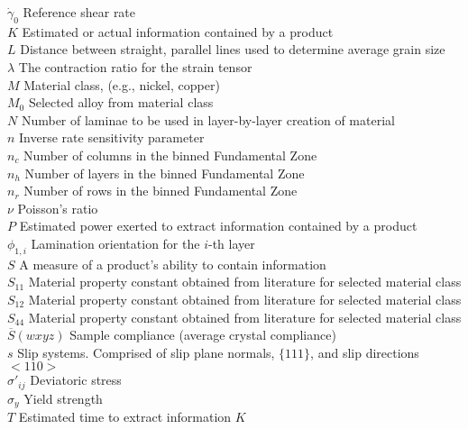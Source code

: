 \begin{tabbing}
$\dot \gamma _0$ \> Reference shear rate\\
$K$             \> Estimated or actual information contained by a product\\
$L$                     \> Distance between straight, parallel lines used to determine average grain size\\
$\lambda$       \> The contraction ratio for the strain tensor\\
$M$                     \> Material class, (e.g., nickel, copper)\\
$M_0$                       \> Selected alloy from material class\\
$N$                         \> Number of laminae to be used in layer-by-layer creation of material\\
$n$                         \> Inverse rate sensitivity parameter\\
$n_c$               \> Number of columns in the binned Fundamental Zone\\
$n_h$               \> Number of layers in the binned Fundamental Zone\\
$n_r$               \> Number of rows in the binned Fundamental Zone\\
$\nu$                       \> Poisson's ratio\\
$P$             \> Estimated power exerted to extract information contained by a product\\
$\phi_{1,i}$                  \> Lamination orientation for the $i$-th layer\\
$S$             \> A measure of a product's ability to contain information\\
$S_{11}$            \> Material property constant obtained from literature for selected material class\\
$S_{12}$            \> Material property constant obtained from literature for selected material class\\
$S_{44}$            \> Material property constant obtained from literature for selected material class\\
$\overline{S}(wxyz)$     \> Sample compliance (average crystal compliance)\\
$s$                         \> Slip systems. Comprised of slip plane normals, $\{111\}$, and slip directions $<110>$\\
$\sigma '_{ij}$ \> Deviatoric stress\\
$\sigma_y$          \> Yield strength\\
$T$             \> Estimated time to extract information $K$\\

\end{tabbing}
